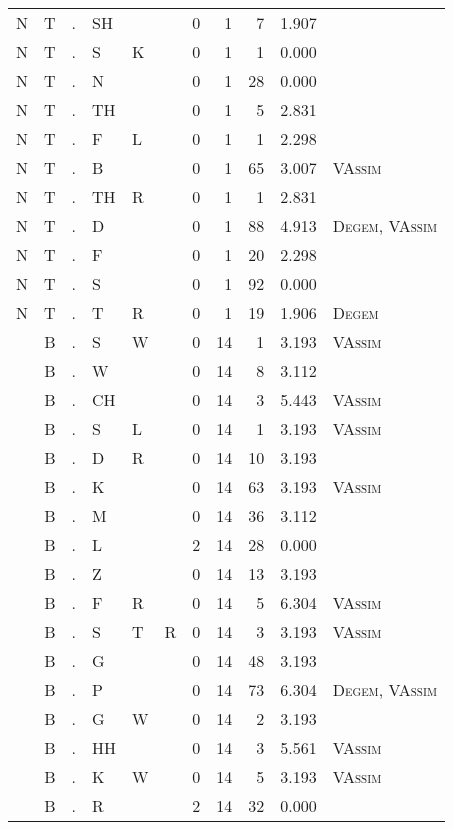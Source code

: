 \begin{longtable}{r@{ } r@{ } c@{ } l@{ } l@{ } l@{ } r r r r l }
N & T & . & SH &  &  & 0 & 1 & 7 & 1.907 &  \\
N & T & . & S & K &  & 0 & 1 & 1 & 0.000 &  \\
N & T & . & N &  &  & 0 & 1 & 28 & 0.000 &  \\
N & T & . & TH &  &  & 0 & 1 & 5 & 2.831 &  \\
N & T & . & F & L &  & 0 & 1 & 1 & 2.298 &  \\
N & T & . & B &  &  & 0 & 1 & 65 & 3.007 & \textsc{VAssim} \\
N & T & . & TH & R &  & 0 & 1 & 1 & 2.831 &  \\
N & T & . & D &  &  & 0 & 1 & 88 & 4.913 & \textsc{Degem}, \textsc{VAssim} \\
N & T & . & F &  &  & 0 & 1 & 20 & 2.298 &  \\
N & T & . & S &  &  & 0 & 1 & 92 & 0.000 &  \\
N & T & . & T & R &  & 0 & 1 & 19 & 1.906 & \textsc{Degem} \\
 & B & . & S & W &  & 0 & 14 & 1 & 3.193 & \textsc{VAssim} \\
 & B & . & W &  &  & 0 & 14 & 8 & 3.112 &  \\
 & B & . & CH &  &  & 0 & 14 & 3 & 5.443 & \textsc{VAssim} \\
 & B & . & S & L &  & 0 & 14 & 1 & 3.193 & \textsc{VAssim} \\
 & B & . & D & R &  & 0 & 14 & 10 & 3.193 &  \\
 & B & . & K &  &  & 0 & 14 & 63 & 3.193 & \textsc{VAssim} \\
 & B & . & M &  &  & 0 & 14 & 36 & 3.112 &  \\
 & B & . & L &  &  & 2 & 14 & 28 & 0.000 &  \\
 & B & . & Z &  &  & 0 & 14 & 13 & 3.193 &  \\
 & B & . & F & R &  & 0 & 14 & 5 & 6.304 & \textsc{VAssim} \\
 & B & . & S & T & R & 0 & 14 & 3 & 3.193 & \textsc{VAssim} \\
 & B & . & G &  &  & 0 & 14 & 48 & 3.193 &  \\
 & B & . & P &  &  & 0 & 14 & 73 & 6.304 & \textsc{Degem}, \textsc{VAssim} \\
 & B & . & G & W &  & 0 & 14 & 2 & 3.193 &  \\
 & B & . & HH &  &  & 0 & 14 & 3 & 5.561 & \textsc{VAssim} \\
 & B & . & K & W &  & 0 & 14 & 5 & 3.193 & \textsc{VAssim} \\
 & B & . & R &  &  & 2 & 14 & 32 & 0.000 &  \\

\end{longtable}
